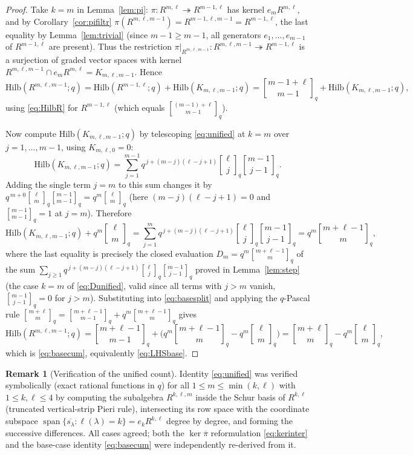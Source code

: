 \documentclass{amsart}
\theoremstyle{definition}
\newtheorem{remark}{Remark}
\newcommand{\Hilb}{\mathrm{Hilb}}
\newcommand{\qbin}[2]{\genfrac{[}{]}{0pt}{}{#1}{#2}_q}
\newcommand{\rkl}{R^{k,\ell}}
\newcommand{\Rklm}{R^{k,\ell,m}}
\begin{document}
\begin{proof}
Take $k=m$ in Lemma~\ref{lem:pi}: $\pi\colon R^{m,\ell}\twoheadrightarrow
R^{m-1,\ell}$ has kernel $e_m R^{m,\ell}$, and by Corollary~\ref{cor:pifiltr}
$\pi(R^{m,\ell,m-1})=R^{m-1,\ell,m-1}=R^{m-1,\ell}$, the last equality by
Lemma~\ref{lem:trivial} (since $m-1\ge m-1$, all generators $e_1,\dots,e_{m-1}$ of
$R^{m-1,\ell}$ are present). Thus the restriction
$\pi|_{R^{m,\ell,m-1}}\colon R^{m,\ell,m-1}\twoheadrightarrow R^{m-1,\ell}$ is a
surjection of graded vector spaces with kernel
$R^{m,\ell,m-1}\cap e_mR^{m,\ell}=K_{m,\ell,m-1}$. Hence
\begin{equation}\label{eq:basesplit}
\Hilb(R^{m,\ell,m-1};q)=\Hilb(R^{m-1,\ell};q)+\Hilb(K_{m,\ell,m-1};q)
=\qbin{m-1+\ell}{m-1}+\Hilb(K_{m,\ell,m-1};q),
\end{equation}
using \eqref{eq:HilbR} for $R^{m-1,\ell}$ (which equals
$\qbin{(m-1)+\ell}{m-1}$).

Now compute $\Hilb(K_{m,\ell,m-1};q)$ by telescoping \eqref{eq:unified} at $k=m$ over
$j=1,\dots,m-1$, using $K_{m,\ell,0}=0$:
\[
\Hilb(K_{m,\ell,m-1};q)
=\sum_{j=1}^{m-1}q^{\,j+(m-j)(\ell-j+1)}\qbin{\ell}{j}\qbin{m-1}{j-1}.
\]
Adding the single term $j=m$ to this sum changes it by
$q^{\,m+0}\qbin{\ell}{m}\qbin{m-1}{m-1}=q^{m}\qbin{\ell}{m}$ (here $(m-j)(\ell-j+1)=0$
and $\qbin{m-1}{m-1}=1$ at $j=m$). Therefore
\[
\Hilb(K_{m,\ell,m-1};q)+q^{m}\qbin{\ell}{m}
=\sum_{j=1}^{m}q^{\,j+(m-j)(\ell-j+1)}\qbin{\ell}{j}\qbin{m-1}{j-1}
=q^{m}\qbin{m+\ell-1}{m},
\]
where the last equality is precisely the closed evaluation $D_m=q^{m}\qbin{m+\ell-1}{m}$
of the sum $\sum_{j\ge1}q^{\,j+(m-j)(\ell-j+1)}\qbin{\ell}{j}\qbin{m-1}{j-1}$ proved in
Lemma~\ref{lem:step} (the case $k=m$ of \eqref{eq:Dunified}, valid since all terms
with $j>m$ vanish, $\qbin{m-1}{j-1}=0$ for $j>m$). Substituting into
\eqref{eq:basesplit} and applying the $q$-Pascal rule
$\qbin{m+\ell}{m}=\qbin{m+\ell-1}{m-1}+q^{m}\qbin{m+\ell-1}{m}$ gives
\[
\Hilb(R^{m,\ell,m-1};q)
=\qbin{m+\ell-1}{m-1}+\big(q^{m}\qbin{m+\ell-1}{m}-q^{m}\qbin{\ell}{m}\big)
=\qbin{m+\ell}{m}-q^{m}\qbin{\ell}{m},
\]
which is \eqref{eq:basecum}, equivalently \eqref{eq:LHSbase}.
\end{proof}

\begin{remark}[Verification of the unified count]\label{rem:verifU}
Identity \eqref{eq:unified} was verified symbolically (exact rational functions in
$q$) for all $1\le m\le\min(k,\ell)$ with $1\le k,\ell\le4$ by computing the
subalgebra $\Rklm$ inside the Schur basis of $\rkl$ (truncated vertical-strip Pieri
rule), intersecting its row space with the coordinate subspace
$\operatorname{span}\{\overline{s_\lambda}:\ell(\lambda)=k\}=e_k\rkl$ degree by
degree, and forming the successive differences. All cases agreed; both the
$\ker\overline\pi$ reformulation \eqref{eq:kerinter} and the base-case identity
\eqref{eq:basecum} were independently re-derived from it.
\end{remark}
\end{document}
